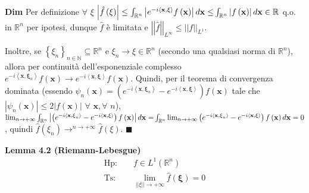 \documentclass{article}
\begin{document}
\textbf{Dim} Per definizione $\forall $ $\xi $ $\left\vert \hat{f}\left( \xi
\right) \right\vert \leq \int_{%
\mathbb{R}
^{n}}\left\vert e^{-i\left\langle \mathbf{x,\xi }\right\rangle }f\left( 
\mathbf{x}\right) \right\vert d\mathbf{x\leq }\int_{%
\mathbb{R}
^{n}}\left\vert f\left( \mathbf{x}\right) \right\vert d\mathbf{x\in 
\mathbb{R}
}$ q.o. in $%
\mathbb{R}
^{n}$ per ipotesi, dunque $\hat{f}$ \`{e} limitata e $\left\vert \left\vert 
\hat{f}\right\vert \right\vert _{L^{\infty }}\leq \left\vert \left\vert
f\right\vert \right\vert _{L^{1}}$.

Inoltre, se $\left\{ \xi _{n}\right\} _{n\in 
\mathbb{N}
}\subseteq 
\mathbb{R}
^{n}$ e $\xi _{n}\rightarrow \xi \in 
\mathbb{R}
^{n}$ (secondo una qualsiasi norma di $%
\mathbb{R}
^{n}$), allora per continuit\`{a} dell'esponenziale complesso $%
e^{-i\left\langle \mathbf{x,\xi }_{n}\right\rangle }f\left( \mathbf{x}%
\right) \rightarrow e^{-i\left\langle \mathbf{x,\xi }\right\rangle }f\left( 
\mathbf{x}\right) $. Quindi, per il teorema di convergenza dominata (essendo 
$\psi _{n}\left( \mathbf{x}\right) =\left( e^{-i\left\langle \mathbf{x,\xi }%
_{n}\right\rangle }-e^{-i\left\langle \mathbf{x,\xi }\right\rangle }\right)
f\left( \mathbf{x}\right) $ tale che $\left\vert \psi _{n}\left( \mathbf{x}%
\right) \right\vert \leq 2\left\vert f\left( \mathbf{x}\right) \right\vert $ 
$\forall $ $\mathbf{x},\forall $ $n$), $\lim_{n\rightarrow +\infty }\int_{%
\mathbb{R}
^{n}}\left\vert \left( e^{-i\left\langle \mathbf{x,\xi }_{n}\right\rangle
}-e^{-i\left\langle \mathbf{x,\xi }\right\rangle }\right) f\left( \mathbf{x}%
\right) \right\vert d\mathbf{x=}\int_{%
\mathbb{R}
^{n}}\lim_{n\rightarrow +\infty }\left( e^{-i\left\langle \mathbf{x,\xi }%
_{n}\right\rangle }-e^{-i\left\langle \mathbf{x,\xi }\right\rangle }\right)
f\left( \mathbf{x}\right) d\mathbf{x}=0$, quindi $\hat{f}\left( \xi
_{n}\right) \rightarrow ^{n\rightarrow +\infty }\hat{f}\left( \xi \right) $. 
$\blacksquare $

\textbf{Lemma 4.2 (Riemann-Lebesgue)}%
\begin{eqnarray*}
\text{Hp}\text{: } &&f\in L^{1}\left( 
\mathbb{R}
^{n}\right) \\
\text{Ts}\text{: } &&\lim_{\left\vert \left\vert \xi \right\vert \right\vert
\rightarrow +\infty }\hat{f}\left( \mathbf{\xi }\right) =0
\end{eqnarray*}
\end{document}
